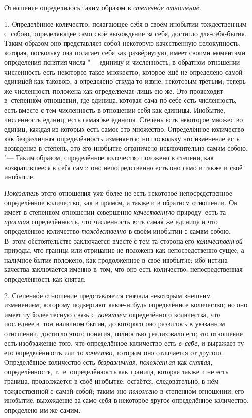 Отношение определилось таким образом в {\em степенн\'{о}е отношение}.


1. Определённое количество, полагающее себя в своём инобытии тождественным
с~собою, определяющее само своё выхождение за себя, достигло для-себя-бытия.
Таким образом оно представляет собой некоторую качественную целокупность,
которая, поскольку она полагает себя как развёрнутую, имеет своими моментами
определения понятия числа "--- единицу и численность; в обратном отношении
численность есть некоторое такое множество, которое ещё не определено самой
единицей как таковою, а определено откуда-то извне, некоторым третьим; теперь
же численность положена как определяемая лишь ею же. Это происходит
в~степенн\'{о}м отношении, где единица, которая сама по себе есть численность,
есть вместе с тем численность в отношении себя как единицы. Инобытие,
численность единиц, есть самая же единица. Степень есть некоторое множество
единиц, каждая из которых есть самое это множество. Определённое количество как
безразличная определённость изменяется; но поскольку это изменение есть
возведение в степень, это его инобытие ограничено исключительно самим собою.
"--- Таким образом, определённое количество положено в степени, как
возвратившееся в себя само; оно непосредственно есть оно само и также
и своё инобытие.

{\em Показатель} этого отношения уже более не есть некоторое непосредственное
определённое количество, как в прямом, а также и в обратном отношении. Он имеет
в степенн\'{о}м отношении совершенно {\em качественную} природу, есть та
{\em простая} определённость, что численность есть сама\'{я} же единица и что
определённое количество {\em тождественно} в своём инобытии с самим собою.
В~этом обстоятельстве заключается вместе с тем та сторона его
{\em количественной} природы, что граница или отрицание не положена как
непосредственно сущее, а наличное бытие положено, как продолженное в своё
инобытие; ибо истина качества заключается именно в~том, что оно есть
количество, непосредственная определённость как снятая.

2. Степенн\'{о}е отношение представляется сначала некоторым внешним изменением,
которому подвергают какое-нибудь определённое количество; но оно имеет ту более
тесную связь с~{\em понятием} определённого количества, что последнее в~том
наличном бытии, до которого оно развилось в указанном отношении, достигло этого
понятия, полностью реализовало его; это отношение есть изображение того,
чт\'{о} определённое количество есть {\em в~себе,} и выражает ту его
определённость или то {\em качество,} которым оно отличается от другого.
Определённое количество есть {\em безразличная, положенная} как {\em снятая,}
определённость, т.~е. определённость как граница, которая также и не есть
граница, продолжается в своё инобытие, остаётся, следовательно, в нём
тождественной с самой собой; таким оно {\em положено} в степенн\'{о}м
отношении; его инобытие, выхождение за само себя в некоторое другое
определённое количество, определено им же самим.

